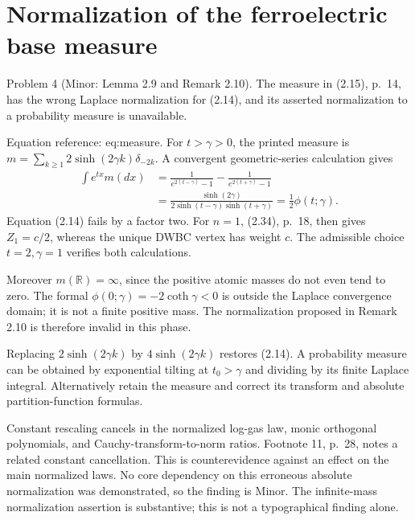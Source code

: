 \documentclass[10pt]{article}
\begin{document}
\section*{Normalization of the ferroelectric base measure}
Problem 4 (Minor: Lemma 2.9 and Remark 2.10).  The measure in (2.15), p. 14, has the wrong Laplace normalization for (2.14), and its asserted normalization to a probability measure is unavailable.\par
Equation reference: eq:measure. For \(t>\gamma>0\), the printed measure is \(m=\sum_{k\ge1}2\sinh(2\gamma k)\delta_{-2k}\). A convergent geometric-series calculation gives \[\begin{aligned}
 \int e^{tx}m(dx)
 &=\frac{1}{e^{2(t-\gamma)}-1}
       -\frac{1}{e^{2(t+\gamma)}-1}\\
 &=\frac{\sinh(2\gamma)}
 {2\sinh(t-\gamma)\sinh(t+\gamma)}
 =\tfrac12\phi(t;\gamma).\end{aligned}\] Equation (2.14) fails by a factor two. For \(n=1\), (2.34), p. 18, then gives \(Z_1=c/2\), whereas the unique DWBC vertex has weight \(c\). The admissible choice \(t=2,\gamma=1\) verifies both calculations.\par
Moreover \(m(\mathbb R)=\infty\), since the positive atomic masses do not even tend to zero. The formal \(\phi(0;\gamma)=-2\coth\gamma<0\) is outside the Laplace convergence domain; it is not a finite positive mass. The normalization proposed in Remark 2.10 is therefore invalid in this phase.\par
Replacing \(2\sinh(2\gamma k)\) by \(4\sinh(2\gamma k)\) restores (2.14). A probability measure can be obtained by exponential tilting at \(t_0>\gamma\) and dividing by its finite Laplace integral. Alternatively retain the measure and correct its transform and absolute partition-function formulas.\par
Constant rescaling cancels in the normalized log-gas law, monic orthogonal polynomials, and Cauchy-transform-to-norm ratios. Footnote 11, p. 28, notes a related constant cancellation. This is counterevidence against an effect on the main normalized laws. No core dependency on this erroneous absolute normalization was demonstrated, so the finding is Minor. The infinite-mass normalization assertion is substantive; this is not a typographical finding alone.\par
\end{document}
